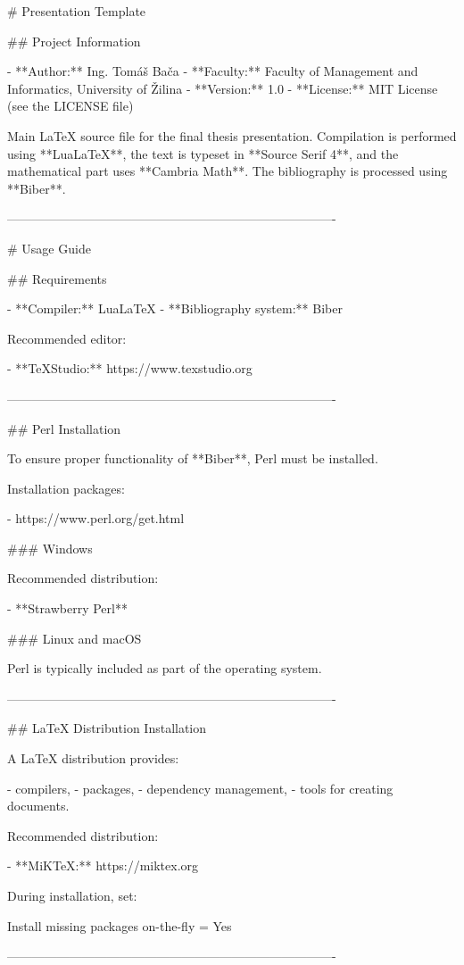 \iffalse
# Presentation Template

## Project Information

- **Author:** Ing. Tomáš Bača  
- **Faculty:** Faculty of Management and Informatics, University of Žilina  
- **Version:** 1.0  
- **License:** MIT License (see the LICENSE file)

Main LaTeX source file for the final thesis presentation. Compilation is performed using **LuaLaTeX**, the text is typeset in **Source Serif 4**, and the mathematical part uses **Cambria Math**. The bibliography is processed using **Biber**.

-------------------------------------------------------------------------------

# Usage Guide

## Requirements

- **Compiler:** LuaLaTeX  
- **Bibliography system:** Biber

Recommended editor:

- **TeXStudio:** https://www.texstudio.org

-------------------------------------------------------------------------------

## Perl Installation

To ensure proper functionality of **Biber**, Perl must be installed.

Installation packages:

- https://www.perl.org/get.html

### Windows

Recommended distribution:

- **Strawberry Perl**

### Linux and macOS

Perl is typically included as part of the operating system.

-------------------------------------------------------------------------------

## LaTeX Distribution Installation

A LaTeX distribution provides:

- compilers,  
- packages,  
- dependency management,  
- tools for creating documents.

Recommended distribution:

- **MiKTeX:** https://miktex.org

During installation, set:

Install missing packages on-the-fly = Yes

-------------------------------------------------------------------------------

